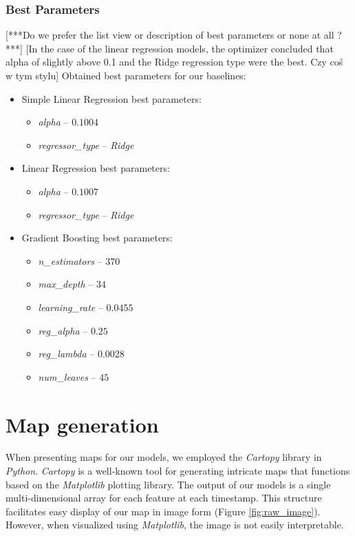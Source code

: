 \subsubsection{Best Parameters}
[***Do we prefer the list view or description of best parameters or none at all ?***]
[In the case of the linear regression models, the optimizer concluded that alpha of slightly above 0.1 and the Ridge regression type were the best. Czy coś w tym stylu]
Obtained best parameters for our baselines:
\begin{itemize}
    \item Simple Linear Regression best parameters:
    \begin{itemize}
        \item \emph{alpha} -- $0.1004$
        \item \emph{regressor\_type} -- \emph{Ridge}
    \end{itemize}
    \item Linear Regression best parameters:
    \begin{itemize}
        \item \emph{alpha} -- $0.1007$
        \item \emph{regressor\_type} -- \emph{Ridge}
    \end{itemize}
    \item Gradient Boosting best parameters:
    \begin{itemize}
        \item \emph{n\_estimators} -- $370$
        \item \emph{max\_depth} -- $34$
        \item \emph{learning\_rate} -- $0.0455$
        \item \emph{reg\_alpha} -- $0.25$
        \item \emph{reg\_lambda} -- $0.0028$
        \item \emph{num\_leaves} -- $45$
    \end{itemize}
\end{itemize}


\section{Map generation}
When presenting maps for our models, we employed the \textit{Cartopy} \cite{Cartopy} library in \textit{Python}. \textit{Cartopy} is a well-known tool for generating intricate maps that functions based on the \textit{Matplotlib} \cite{Hunter:2007} plotting library.
The output of our models is a single multi-dimensional array for each feature at each timestamp. This structure facilitates easy display of our map in image form (Figure \ref{fig:raw_image}). However, when visualized using \textit{Matplotlib}, the image is not easily interpretable.

